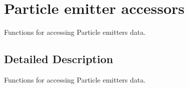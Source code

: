\hypertarget{group____accessors__particles}{\section{Particle emitter accessors}
\label{group____accessors__particles}
}


Functions for accessing Particle emitters data.  




\subsection{Detailed Description}
Functions for accessing Particle emitters data. 